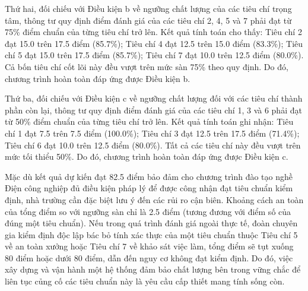 Thứ hai, đối chiếu với Điều kiện b về ngưỡng chất lượng của các tiêu chí trọng tâm, thông tư quy định điểm đánh giá của các tiêu chí 2, 4, 5 và 7 phải đạt từ 75\% điểm chuẩn của từng tiêu chí trở lên. Kết quả tính toán cho thấy: Tiêu chí 2 đạt 15.0 trên 17.5 điểm (85.7\%); Tiêu chí 4 đạt 12.5 trên 15.0 điểm (83.3\%); Tiêu chí 5 đạt 15.0 trên 17.5 điểm (85.7\%); Tiêu chí 7 đạt 10.0 trên 12.5 điểm (80.0\%). Cả bốn tiêu chí cốt lõi này đều vượt trên mức sàn 75\% theo quy định. Do đó, chương trình hoàn toàn đáp ứng được Điều kiện b.

Thứ ba, đối chiếu với Điều kiện c về ngưỡng chất lượng đối với các tiêu chí thành phần còn lại, thông tư quy định điểm đánh giá của các tiêu chí 1, 3 và 6 phải đạt từ 50\% điểm chuẩn của từng tiêu chí trở lên. Kết quả tính toán ghi nhận: Tiêu chí 1 đạt 7.5 trên 7.5 điểm (100.0\%); Tiêu chí 3 đạt 12.5 trên 17.5 điểm (71.4\%); Tiêu chí 6 đạt 10.0 trên 12.5 điểm (80.0\%). Tất cả các tiêu chí này đều vượt trên mức tối thiểu 50\%. Do đó, chương trình hoàn toàn đáp ứng được Điều kiện c.

Mặc dù kết quả dự kiến đạt 82.5 điểm bảo đảm cho chương trình đào tạo nghề Điện công nghiệp đủ điều kiện pháp lý để được công nhận đạt tiêu chuẩn kiểm định, nhà trường cần đặc biệt lưu ý đến các rủi ro cận biên. Khoảng cách an toàn của tổng điểm so với ngưỡng sàn chỉ là 2.5 điểm (tương đương với điểm số của đúng một tiêu chuẩn). Nếu trong quá trình đánh giá ngoài thực tế, đoàn chuyên gia kiểm định độc lập bác bỏ tính xác thực của một tiêu chuẩn thuộc Tiêu chí 5 về an toàn xưởng hoặc Tiêu chí 7 về khảo sát việc làm, tổng điểm sẽ tụt xuống 80 điểm hoặc dưới 80 điểm, dẫn đến nguy cơ không đạt kiểm định. Do đó, việc xây dựng và vận hành một hệ thống đảm bảo chất lượng bên trong vững chắc để liên tục củng cố các tiêu chuẩn này là yêu cầu cấp thiết mang tính sống còn.
